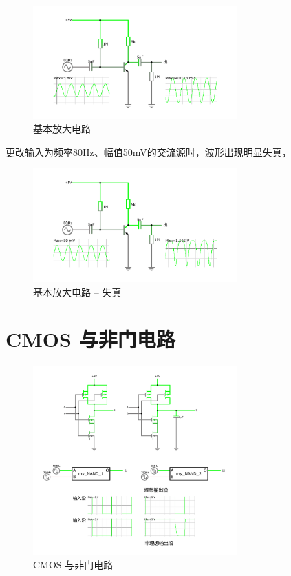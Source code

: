 \documentclass{article}
\begin{document}
\begin{figure}[htbp]
    \centering
    \includegraphics[width=0.7\textwidth]{基本放大电路.pdf}
    \caption{基本放大电路}
\end{figure}

更改输入为频率80Hz、幅值50mV的交流源时，波形出现明显失真，

\begin{figure}[htbp]
    \centering
    \includegraphics[width=0.7\textwidth]{基本放大电路_失真.pdf}
    \caption{基本放大电路 -- 失真}
\end{figure}

\section{CMOS 与非门电路}

\begin{figure}[htbp]
    \centering
    \includegraphics[width=0.7\textwidth]{NAND.pdf}
    \caption{CMOS 与非门电路}
\end{figure}
\end{document}
